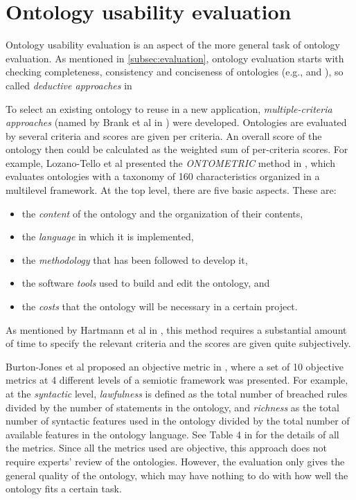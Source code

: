 
\section{Ontology usability evaluation}
Ontology usability evaluation is an aspect of the more general task of ontology evaluation. As mentioned in \ref{subsec:evaluation}, ontology evaluation starts with checking completeness, consistency and conciseness of ontologies (e.g., \cite{gruninger1995methodology} and \cite{gomez2001evaluation}), so called \emph{deductive approaches} in 

To select an existing ontology to reuse in a new application, \emph{multiple-criteria approaches} (named by Brank et al in \cite{brank2005survey}) were developed. Ontologies are evaluated by several criteria and scores are given per criteria. An overall score of the ontology then could be calculated as the weighted sum of per-criteria scores. For example, Lozano-Tello et al presented the \emph{ONTOMETRIC} method in \cite{lozano2003selection,lozano2004ontometric}, which evaluates ontologies with a taxonomy of
160 characteristics organized in a multilevel framework. At the top level, there are five basic aspects. These are: 
\begin{itemize}
	\item the \emph{content} of the ontology and the
	organization of their contents,
	\item the \emph{language}
	in which it is implemented, 
	\item the \emph{methodology}
	that has been followed to develop it,
	\item the software \emph{tools} used to build and edit
	the ontology, and 
	\item the \emph{costs} that the ontology
	will be necessary in a certain project.
\end{itemize} 
As mentioned by Hartmann et al in \cite{hartmann2005d1}, this method requires a substantial amount of time to specify the relevant criteria and the scores are given quite subjectively.

Burton-Jones et al proposed an objective metric in \cite{burton2005semiotic}, where a set of 10 objective metrics at 4 different levels of a semiotic framework was presented. For example, at the \emph{syntactic} level, \emph{lawfulness} is defined as the total number of breached rules divided by the number of statements in the ontology, and \emph{richness} as the total number of syntactic features used in the ontology divided by the total number of available features in the ontology language. See Table 4 in \cite{burton2005semiotic} for the details of all the metrics. Since all the metrics used are objective, this approach does not require experts' review of the ontologies. However, the evaluation only gives the general quality of the ontology, which may have nothing to do with how well the ontology fits a certain task.

